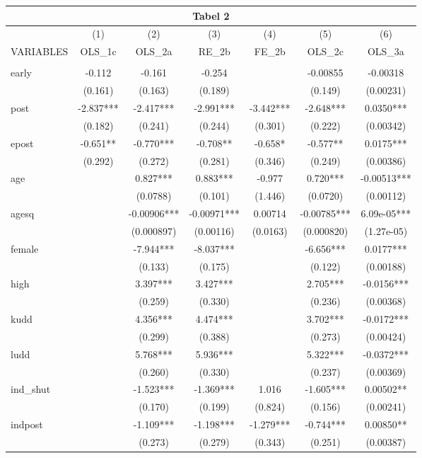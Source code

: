 \documentclass[]{article}
\begin{document}
\begin{tabular}{lcccccc}
\multicolumn{7}{c}{Tabel 2} \\ \hline
 & (1) & (2) & (3) & (4) & (5) & (6) \\
VARIABLES & OLS\_1c & OLS\_2a & RE\_2b & FE\_2b & OLS\_2c & OLS\_3a \\ \hline
 &  &  &  &  &  &  \\
early & -0.112 & -0.161 & -0.254 &  & -0.00855 & -0.00318 \\
 & (0.161) & (0.163) & (0.189) &  & (0.149) & (0.00231) \\
post & -2.837*** & -2.417*** & -2.991*** & -3.442*** & -2.648*** & 0.0350*** \\
 & (0.182) & (0.241) & (0.244) & (0.301) & (0.222) & (0.00342) \\
epost & -0.651** & -0.770*** & -0.708** & -0.658* & -0.577** & 0.0175*** \\
 & (0.292) & (0.272) & (0.281) & (0.346) & (0.249) & (0.00386) \\
age &  & 0.827*** & 0.883*** & -0.977 & 0.720*** & -0.00513*** \\
 &  & (0.0788) & (0.101) & (1.446) & (0.0720) & (0.00112) \\
agesq &  & -0.00906*** & -0.00971*** & 0.00714 & -0.00785*** & 6.09e-05*** \\
 &  & (0.000897) & (0.00116) & (0.0163) & (0.000820) & (1.27e-05) \\
female &  & -7.944*** & -8.037*** &  & -6.656*** & 0.0177*** \\
 &  & (0.133) & (0.175) &  & (0.122) & (0.00188) \\
high &  & 3.397*** & 3.427*** &  & 2.705*** & -0.0156*** \\
 &  & (0.259) & (0.330) &  & (0.236) & (0.00368) \\
kudd &  & 4.356*** & 4.474*** &  & 3.702*** & -0.0172*** \\
 &  & (0.299) & (0.388) &  & (0.273) & (0.00424) \\
ludd &  & 5.768*** & 5.936*** &  & 5.322*** & -0.0372*** \\
 &  & (0.260) & (0.330) &  & (0.237) & (0.00369) \\
ind\_shut &  & -1.523*** & -1.369*** & 1.016 & -1.605*** & 0.00502** \\
 &  & (0.170) & (0.199) & (0.824) & (0.156) & (0.00241) \\
indpost &  & -1.109*** & -1.198*** & -1.279*** & -0.744*** & 0.00850** \\
 &  & (0.273) & (0.279) & (0.343) & (0.251) & (0.00387) \\

\end{tabular}
\end{document}
